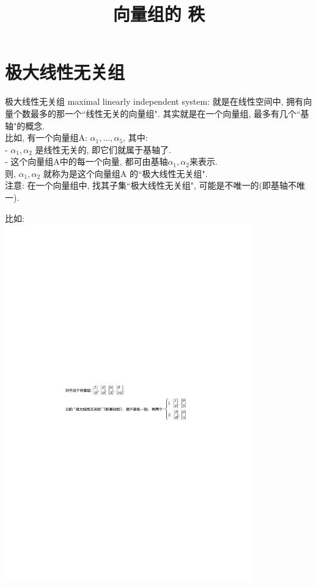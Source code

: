\documentclass[UTF8]{ctexart}
\title{向量组的 秩}
\begin{document}
\tableofcontents %
\date{} %
\maketitle  %

\section{极大线性无关组}

极大线性无关组 maximal linearly independent system: 就是在线性空间中, 拥有向量个数最多的那一个``线性无关的向量组". 其实就是在一个向量组, 最多有几个``基轴"的概念.  \\

比如, 有一个向量组A: $\alpha_1, ..., \alpha_5$, 其中:\\
- $\alpha_1, \alpha_2$ 是线性无关的, 即它们就属于基轴了. \\
- 这个向量组A中的每一个向量, 都可由基轴$\alpha_1, \alpha_2$来表示. \\
则, $\alpha_1, \alpha_2$ 就称为是这个向量组A 的``极大线性无关组". \\

注意: 在一个向量组中, 找其子集``极大线性无关组", 可能是不唯一的(即基轴不唯一). \\ 

\begin{myEnvSample}
比如:  \\
\includegraphics[width=0.8\textwidth]{img/0110.pdf}
\end{myEnvSample}
\end{document}
